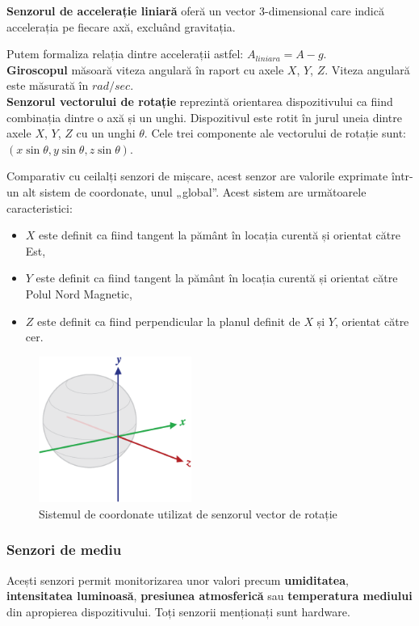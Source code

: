 \documentclass[12pt,a4paper]{article}
\begin{document}
	\textbf{Senzorul de accelerație liniară} oferă un vector 3-dimensional care indică accelerația pe fiecare axă, excluând gravitația.

	Putem formaliza relația dintre accelerații astfel:
	$A_{liniara} = A - g$.\\

	\textbf{Giroscopul} măsoară viteza angulară în raport cu axele $X$, $Y$, $Z$. Viteza angulară este măsurată în $rad/sec$.\\

	\textbf{Senzorul vectorului de rotație} reprezintă orientarea dispozitivului ca fiind combinația dintre o axă și un unghi. Dispozitivul este rotit în jurul uneia dintre axele $X$, $Y$, $Z$ cu un unghi $\theta$. Cele trei componente ale vectorului de rotație sunt: $(x \sin{\theta}, y \sin{\theta}, z \sin{\theta})$. 
	
	Comparativ cu ceilalți senzori de mișcare, acest senzor are valorile exprimate într-un alt sistem de coordonate, unul „global”.
	Acest sistem are următoarele caracteristici:
	\begin{itemize}
	\item $X$ este definit ca fiind tangent la pământ în locația curentă și orientat către Est,
	\item $Y$ este definit ca fiind tangent la pământ în locația curentă și orientat către Polul Nord Magnetic,
	\item $Z$ este definit ca fiind perpendicular la planul definit de $X$ și $Y$, orientat către cer.
	\end{itemize}

\begin{figure}[h]
\centering
\includegraphics[width=5cm]{figures/axis_globe.png}
\caption{Sistemul de coordonate utilizat de senzorul vector de rotație}
\end{figure}

\subsubsection{Senzori de mediu}
Acești senzori permit monitorizarea unor valori precum \textbf{umiditatea}, \textbf{intensitatea luminoasă}, \textbf{presiunea atmosferică} sau \textbf{temperatura mediului} din apropierea dispozitivului. Toți senzorii menționați sunt hardware.
\end{document}
